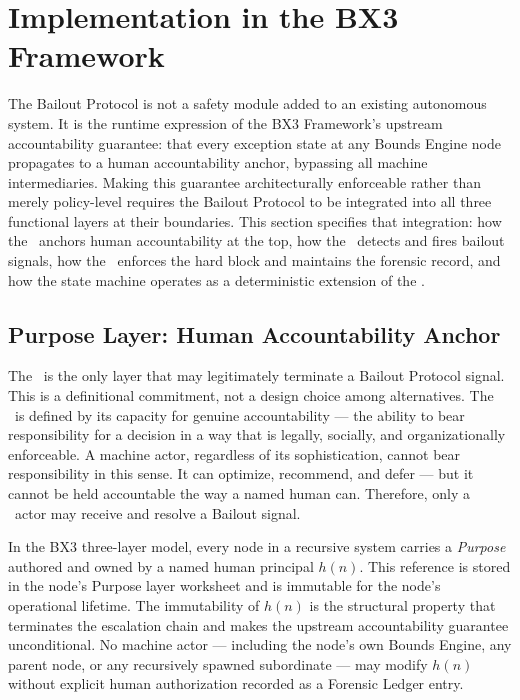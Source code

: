 \section{Implementation in the BX3 Framework}
\label{sec:bailout-implementation}

The Bailout Protocol is not a safety module added to an existing autonomous system. It is the runtime expression of the BX3 Framework's upstream accountability guarantee: that every exception state at any Bounds Engine node propagates to a human accountability anchor, bypassing all machine intermediaries. Making this guarantee architecturally enforceable rather than merely policy-level requires the Bailout Protocol to be integrated into all three functional layers at their boundaries. This section specifies that integration: how the \purpose\ anchors human accountability at the top, how the \bounds\ detects and fires bailout signals, how the \fact\ enforces the hard block and maintains the forensic record, and how the state machine operates as a deterministic extension of the \fact.

\subsection{Purpose Layer: Human Accountability Anchor}
\label{sec:purpose-anchor}

The \purpose\ is the only layer that may legitimately terminate a Bailout Protocol signal. This is a definitional commitment, not a design choice among alternatives. The \purpose\ is defined by its capacity for genuine accountability --- the ability to bear responsibility for a decision in a way that is legally, socially, and organizationally enforceable. A machine actor, regardless of its sophistication, cannot bear responsibility in this sense. It can optimize, recommend, and defer --- but it cannot be held accountable the way a named human can. Therefore, only a \purpose\ actor may receive and resolve a Bailout signal.

In the BX3 three-layer model, every node in a recursive system carries a \textit{Purpose} authored and owned by a named human principal $h(n)$. This reference is stored in the node's Purpose layer worksheet and is immutable for the node's operational lifetime. The immutability of $h(n)$ is the structural property that terminates the escalation chain and makes the upstream accountability guarantee unconditional. No machine actor --- including the node's own Bounds Engine, any parent node, or any recursively spawned subordinate --- may modify $h(n)$ without explicit human authorization recorded as a Forensic Ledger entry.

